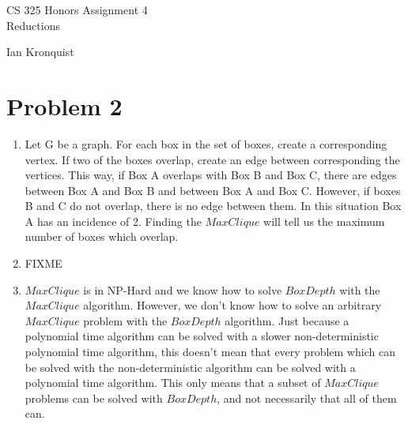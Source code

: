 \documentclass[12pt,letterpaper]{article}
\begin{document}
\begin{titlepage}
    \vspace*{4cm}
    \begin{flushright}
    {\huge
        CS 325 Honors Assignment 4\\[1cm]
    }
    {\large
        Reductions
    }
    \end{flushright}
    \begin{flushleft}
    \end{flushleft}
    \begin{flushright}
    Ian Kronquist
    \end{flushright}

\end{titlepage}


\section*{Problem 2}
\begin{enumerate}[label=(\alph*)]
    \item Let G be a graph. For each box in the set of boxes, create a corresponding vertex. If two of the boxes overlap, create an edge between corresponding the vertices. This way, if Box A overlaps with Box B and Box C, there are edges between Box A and Box B and between Box A and Box C. However, if boxes B and C do not overlap, there is no edge between them. In this situation Box A has an incidence of 2. Finding the $MaxClique$ will tell us the maximum number of boxes which overlap.\\
    \item FIXME\\
    \item $MaxClique$ is in NP-Hard and we know how to solve $BoxDepth$ with the $MaxClique$ algorithm. However, we don't know how to solve an arbitrary $MaxClique$ problem with the $BoxDepth$ algorithm. Just because a polynomial time algorithm can be solved with a slower non-deterministic polynomial time algorithm, this doesn't mean that every problem which can be solved with the non-deterministic algorithm can be solved with a polynomial time algorithm. This only means that a subset of $MaxClique$ problems can be solved with $BoxDepth$, and not necessarily that all of them can.
\end{enumerate}
\end{document}
